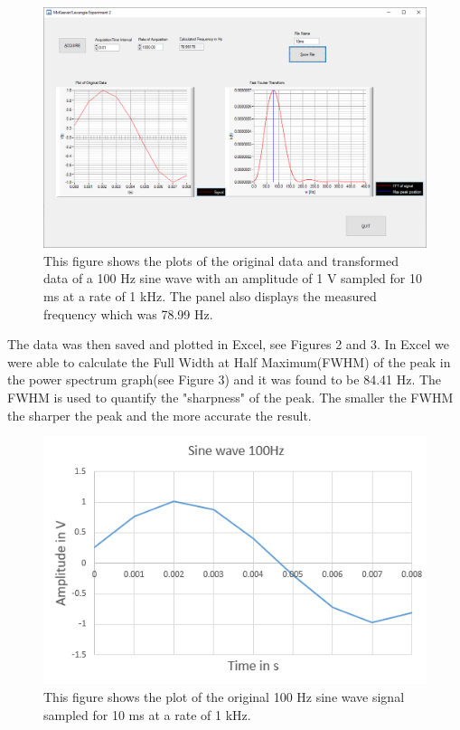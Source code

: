 \documentclass{article}
\begin{document}
\begin{figure}[H]
\includegraphics[scale=0.5,center]{Sine10ms.png}
\caption{This figure shows the plots of the original data and transformed data of a 100 Hz sine wave with an amplitude of 1 V sampled for 10 ms at a rate of 1 kHz.  The panel also displays the measured frequency which was 78.99 Hz.}
\end{figure}

The data was then saved and plotted in Excel, see Figures 2 and 3.  In Excel we were able to calculate the Full Width at Half Maximum(FWHM) of the peak in the power spectrum graph(see Figure 3) and it was found to be 84.41 Hz.  The FWHM is used to quantify the "sharpness" of the peak.  The smaller the FWHM the sharper the peak and the more accurate the result.

\begin{figure}[H]
\includegraphics[scale=.6,center]{Sine10msex.PNG}
\caption{This figure shows the plot of the original 100 Hz sine wave signal sampled for 10 ms at a rate of 1 kHz.}
\end{figure}
\end{document}
